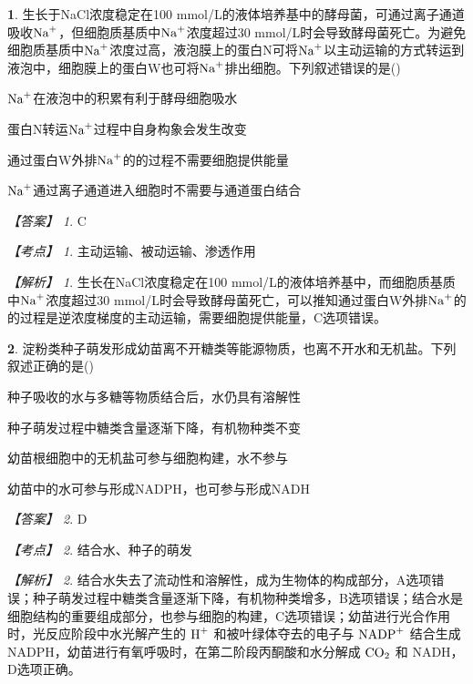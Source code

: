 \documentclass[UTF8, 10pt, a4paper, oneside]{ctexart}
\theoremstyle{definition}
\newtheorem{exercise}{}
\theoremstyle{remark}
\newtheorem*{answer}{【答案】}
\newtheorem*{point}{【考点】}      %
\newtheorem*{explanation}{【解析】}     %
\theoremstyle{plain}
\begin{document}
\begin{exercise}
    生长于NaCl浓度稳定在100 mmol/L的液体培养基中的酵母菌，可通过离子通道吸收$\ce{Na+}$，但细胞质基质中$\ce{Na+}$浓度超过30 mmol/L时会导致酵母菌死亡。为避免细胞质基质中$\ce{Na+}$浓度过高，液泡膜上的蛋白N可将$\ce{Na+}$以主动运输的方式转运到液泡中，细胞膜上的蛋白W也可将$\ce{Na+}$排出细胞。下列叙述错误的是\quad(\quad)
    \begin{adjustwidth}{2em}{}
        \begin{asparaenum}[A. ]
            \item $\ce{Na+}$在液泡中的积累有利于酵母细胞吸水
            \item 蛋白N转运$\ce{Na+}$过程中自身构象会发生改变
            \item 通过蛋白W外排$\ce{Na+}$的的过程不需要细胞提供能量
            \item $\ce{Na+}$通过离子通道进入细胞时不需要与通道蛋白结合
        \end{asparaenum}
    \end{adjustwidth}
    \begin{answer}
        C
    \end{answer}
    \begin{point}
        主动运输、被动运输、渗透作用
    \end{point}
    \begin{explanation}
        生长在NaCl浓度稳定在100 mmol/L的液体培养基中，而细胞质基质中$\ce{Na+}$浓度超过30 mmol/L时会导致酵母菌死亡，可以推知通过蛋白W外排$\ce{Na+}$的的过程是逆浓度梯度的主动运输，需要细胞提供能量，C选项错误。
    \end{explanation}
\end{exercise}
\begin{exercise}
    淀粉类种子萌发形成幼苗离不开糖类等能源物质，也离不开水和无机盐。下列叙述正确的是\quad(\quad)
    \begin{adjustwidth}{2em}{}
        \begin{asparaenum}[A. ]
            \item 种子吸收的水与多糖等物质结合后，水仍具有溶解性
            \item 种子萌发过程中糖类含量逐渐下降，有机物种类不变
            \item 幼苗根细胞中的无机盐可参与细胞构建，水不参与
            \item 幼苗中的水可参与形成NADPH，也可参与形成NADH
        \end{asparaenum}
    \end{adjustwidth}
    \begin{answer}
        D
    \end{answer}
    \begin{point}
        结合水、种子的萌发
    \end{point}
    \begin{explanation}
        结合水失去了流动性和溶解性，成为生物体的构成部分，A选项错误；种子萌发过程中糖类含量逐渐下降，有机物种类增多，B选项错误；结合水是细胞结构的重要组成部分，也参与细胞的构建，C选项错误；幼苗进行光合作用时，光反应阶段中水光解产生的 $\ce{H^+}$ 和被叶绿体夺去的电子与 $\ce{NADP+}$ 结合生成 NADPH，幼苗进行有氧呼吸时，在第二阶段丙酮酸和水分解成 $\ce{CO2}$ 和 NADH，D选项正确。
    \end{explanation}
\end{exercise}
\end{document}
